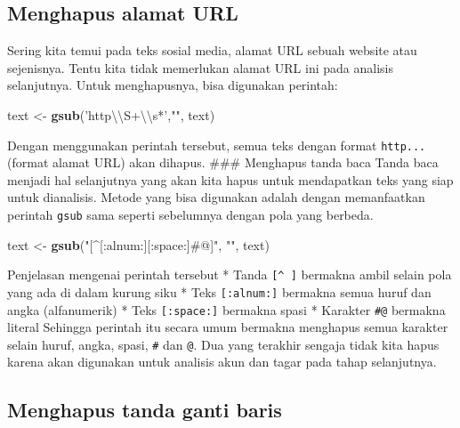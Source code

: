 \documentclass[]{book}
\newenvironment{Shaded}{\begin{snugshade}}{\end{snugshade}}
\newcommand{\CharTok}[1]{\textcolor[rgb]{0.31,0.60,0.02}{#1}}
\newcommand{\KeywordTok}[1]{\textcolor[rgb]{0.13,0.29,0.53}{\textbf{#1}}}
\newcommand{\NormalTok}[1]{#1}
\newcommand{\StringTok}[1]{\textcolor[rgb]{0.31,0.60,0.02}{#1}}
\begin{document}
\hypertarget{menghapus-alamat-url}{%
\subsection{Menghapus alamat URL}\label{menghapus-alamat-url}}

Sering kita temui pada teks sosial media, alamat URL sebuah website atau
sejenisnya. Tentu kita tidak memerlukan alamat URL ini pada analisis
selanjutnya. Untuk menghapusnya, bisa digunakan perintah:

\begin{Shaded}
\begin{Highlighting}[]
\NormalTok{text <-}\StringTok{ }\KeywordTok{gsub}\NormalTok{(}\StringTok{'http}\CharTok{\textbackslash{}\textbackslash{}}\StringTok{S+}\CharTok{\textbackslash{}\textbackslash{}}\StringTok{s*'}\NormalTok{,}\StringTok{""}\NormalTok{, text)}
\end{Highlighting}
\end{Shaded}

Dengan menggunakan perintah tersebut, semua teks dengan format
\texttt{http...} (format alamat URL) akan dihapus. \#\#\# Menghapus
tanda baca Tanda baca menjadi hal selanjutnya yang akan kita hapus untuk
mendapatkan teks yang siap untuk dianalisis. Metode yang bisa digunakan
adalah dengan memanfaatkan perintah \texttt{gsub} sama seperti
sebelumnya dengan pola yang berbeda.

\begin{Shaded}
\begin{Highlighting}[]
\NormalTok{text <-}\StringTok{ }\KeywordTok{gsub}\NormalTok{(}\StringTok{"[^[:alnum:][:space:]#@]"}\NormalTok{, }\StringTok{""}\NormalTok{, text)}
\end{Highlighting}
\end{Shaded}

Penjelasan mengenai perintah tersebut * Tanda \texttt{{[}\^{}\ {]}}
bermakna ambil selain pola yang ada di dalam kurung siku * Teks
\texttt{{[}:alnum:{]}} bermakna semua huruf dan angka (alfanumerik) *
Teks \texttt{{[}:space:{]}} bermakna spasi * Karakter \texttt{\#@}
bermakna literal Sehingga perintah itu secara umum bermakna menghapus
semua karakter selain huruf, angka, spasi, \texttt{\#} dan \texttt{@}.
Dua yang terakhir sengaja tidak kita hapus karena akan digunakan untuk
analisis akun dan tagar pada tahap selanjutnya.

\hypertarget{menghapus-tanda-ganti-baris}{%
\subsection{Menghapus tanda ganti
baris}\label{menghapus-tanda-ganti-baris}}
\end{document}
